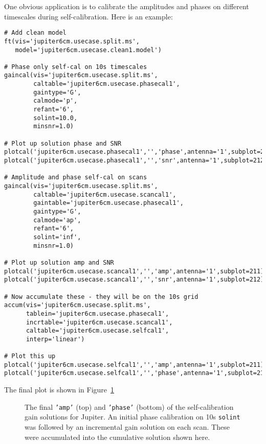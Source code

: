 One obvious application is to calibrate the amplitudes and phases
on different timescales during self-calibration.
Here is an example:
\small
\begin{verbatim}
# Add clean model 
ft(vis='jupiter6cm.usecase.split.ms',
   model='jupiter6cm.usecase.clean1.model')

# Phase only self-cal on 10s timescales
gaincal(vis='jupiter6cm.usecase.split.ms',
        caltable='jupiter6cm.usecase.phasecal1',
        gaintype='G',
        calmode='p',
        refant='6',
        solint=10.0,
        minsnr=1.0)

# Plot up solution phase and SNR
plotcal('jupiter6cm.usecase.phasecal1','','phase',antenna='1',subplot=211)
plotcal('jupiter6cm.usecase.phasecal1','','snr',antenna='1',subplot=212)

# Amplitude and phase self-cal on scans
gaincal(vis='jupiter6cm.usecase.split.ms',
        caltable='jupiter6cm.usecase.scancal1',
        gaintable='jupiter6cm.usecase.phasecal1',
        gaintype='G',
        calmode='ap',
        refant='6',
        solint='inf',
        minsnr=1.0)

# Plot up solution amp and SNR
plotcal('jupiter6cm.usecase.scancal1','','amp',antenna='1',subplot=211)
plotcal('jupiter6cm.usecase.scancal1','','snr',antenna='1',subplot=212)

# Now accumulate these - they will be on the 10s grid
accum(vis='jupiter6cm.usecase.split.ms',
      tablein='jupiter6cm.usecase.phasecal1',
      incrtable='jupiter6cm.usecase.scancal1',
      caltable='jupiter6cm.usecase.selfcal1',
      interp='linear')

# Plot this up
plotcal('jupiter6cm.usecase.selfcal1','','amp',antenna='1',subplot=211)
plotcal('jupiter6cm.usecase.selfcal1','','phase',antenna='1',subplot=212)
\end{verbatim}
\normalsize
The final plot is shown in Figure~\ref{fig:accum_jupiter}

\begin{figure}[h!]
\begin{center}
\caption{\label{fig:accum_jupiter} The final {\tt 'amp'} (top) and
{\tt 'phase'} (bottom) of the self-calibration gain solutions
for Jupiter.  An initial phase calibration on 10s {\tt solint} was
followed by an incremental gain solution on each scan.  These
were accumulated into the cumulative solution shown here.
}
\hrulefill
\end{center}
\end{figure}


